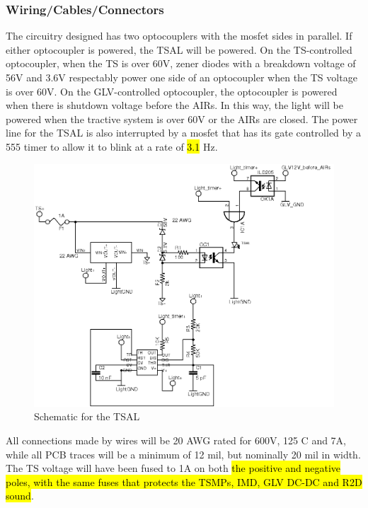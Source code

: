 \documentclass{article}
\DeclareRobustCommand{\hlr}[1]{{\sethlcolor{red}\hl{#1}}}
\begin{document}
        \subsubsection{Wiring/Cables/Connectors}


             The circuitry designed has two optocouplers with the mosfet sides in parallel. If either optocoupler is powered, the TSAL will be powered. On the TS-controlled optocoupler, when the TS is over 60V, zener diodes with a breakdown voltage of 56V and 3.6V respectably power one side of an optocoupler when the TS voltage is over 60V. On the GLV-controlled optocoupler, the optocoupler is powered when there is shutdown voltage before the AIRs. In this way, the light will be powered when the tractive system is over 60V or the AIRs are closed. The power line for the TSAL is also interrupted by a mosfet that has its gate controlled by a 555 timer to allow it to blink at a rate of \hlr{3.1} Hz.

            \begin{figure}[H]
            \centering
            \includegraphics[width = 0.7 \textwidth]{TSAL_FSAE}
            \caption{Schematic for the TSAL}
            \label{TSALschem}
            \end{figure}

            All connections made by wires will be 20 AWG rated for 600V, 125 \degree C and 7A, while all PCB traces will be a minimum of 12 mil, but nominally 20 mil in width. The TS voltage will have been fused to 1A on both \hlr{the positive and negative poles, with the same fuses that protects the TSMPs, IMD, GLV DC-DC and R2D sound}.
\end{document}
